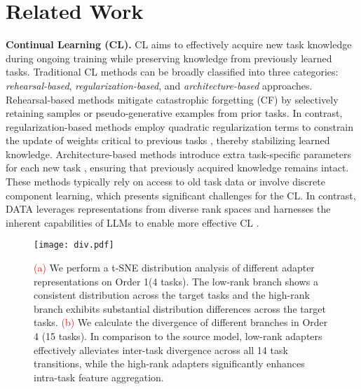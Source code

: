 \section{Related Work}
\noindent \textbf{Continual Learning (CL).} CL aims to effectively acquire new task knowledge during ongoing training while preserving knowledge from previously learned tasks. Traditional CL methods can be broadly classified into three categories: \textit{rehearsal-based}, \textit{regularization-based}, and \textit{architecture-based} approaches. Rehearsal-based methods mitigate catastrophic forgetting (CF) by selectively retaining samples \cite{GCRGC, inscl, seekr} or pseudo-generative examples \cite{ContinualLW, Sun2019LAMOLLM} from prior tasks. In contrast, regularization-based methods employ quadratic regularization terms to constrain the update of weights critical to previous tasks \cite{Zhu2024ModelTM, migu}, thereby stabilizing learned knowledge. Architecture-based methods introduce extra task-specific parameters for each new task \cite{olora, sapt}, ensuring that previously acquired knowledge remains intact. These methods typically rely on access to old task data or involve discrete component learning, which presents significant challenges for the CL. In contrast, DATA leverages representations from diverse rank spaces and harnesses the inherent capabilities of LLMs to enable more effective CL \cite{cotta}.

\begin{figure*}[t]
\centerline{\texttt{[image: div.pdf]}}
\caption{\textcolor{red}{(a)} We perform a t-SNE distribution analysis of different adapter representations on Order 1(4 tasks). The low-rank branch shows a consistent distribution across the target tasks and the high-rank branch exhibits substantial distribution differences across the target tasks. \textcolor{red}{(b)} We calculate the divergence of different branches in Order 4 (15 tasks). In comparison to the source model, low-rank adapters effectively alleviates inter-task divergence across all 14 task transitions, while the high-rank adapters significantly enhances intra-task feature aggregation.
}
\label{div}
\end{figure*}


